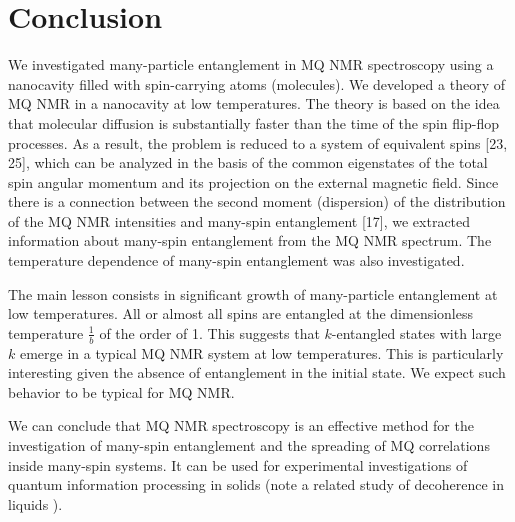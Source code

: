 \section{Conclusion} 
\label{sec:conslusions}
We investigated many-particle entanglement in MQ NMR spectroscopy using a nanocavity filled with spin-carrying atoms (molecules). 
We developed a theory of MQ NMR in a nanocavity at low temperatures. 
The theory is based on the idea that  molecular diffusion is substantially faster than the time of the spin flip-flop processes. 
As a result, the problem is reduced to a system of equivalent spins [23, 25], which can be analyzed in the basis of the common eigenstates of the total spin angular momentum and its projection on the external magnetic field. 
Since there is a connection between the second moment (dispersion) of the distribution of the MQ NMR intensities and many-spin entanglement [17], we extracted information about many-spin entanglement from the MQ NMR spectrum. The temperature dependence of many-spin entanglement was also investigated.
\par
The main lesson consists in significant growth of many-particle entanglement at low temperatures. 
All or almost all spins are entangled at the dimensionless temperature $\frac{1}{b}$ of the order of 1. 
This suggests that $k$-entangled states with large $k$ emerge in a typical MQ NMR system at low temperatures. 
This is particularly interesting given the absence of entanglement in the initial state. We expect such behavior to be typical for MQ NMR. 
\par
We can conclude that MQ NMR spectroscopy is an effective method for the investigation of many-spin entanglement and the spreading of MQ correlations inside many-spin systems. It can be used for experimental investigations of quantum information processing in solids (note a related study of decoherence in liquids \cite{HOU2017863}).
\par 
